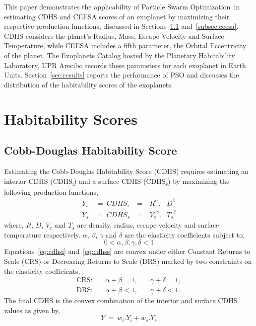 \documentclass[10pt]{article}
\newcommand{\pso}{Particle Swarm Optimization}
\begin{document}
This paper demonstrates the applicability of \pso\ in estimating CDHS and CEESA scores of an exoplanet by maximizing
their respective production functions, discussed in Sections~\ref{subsec:cdhs} and~\ref{subsec:ceesa}. CDHS considers
the planet's Radius, Mass, Escape Velocity and Surface Temperature, while CEESA includes a fifth parameter, the Orbital
Eccentricity of the planet. The Exoplanets Catalog hosted by the Planetary Habitability Laboratory, UPR Arecibo records
these parameters for each exoplanet in Earth Units. Section~\ref{sec:results} reports the performance of PSO and
discusses the distribution of the habitability scores of the exoplanets.


\section{Habitability Scores}\label{sec:habscore}

\subsection{Cobb-Douglas Habitability Score}\label{subsec:cdhs}
Estimating the Cobb-Douglas Habitability Score (CDHS) requires estimating an interior CDHS (CDHS\textsubscript{i}) and a
surface CDHS (CDHS\textsubscript{s}) by maximizing the following production functions,
\begin{subequations}
  \begin{alignat}{4}
    Y_i\ &=\ {CDHS}_i\ &=&\ R^\alpha.&D^\beta\label{eq:cdhsi}\\
    Y_s\ &=\ {CDHS}_s\ &=&\ {V_e}^\gamma.&{T_s}^\delta\label{eq:cdhss}
  \end{alignat}
\end{subequations}
where, $R$, $D$, $V_e$ and $T_s$ are density, radius, escape velocity and surface temperature respectively. $\alpha$,
$\beta$, $\gamma$ and $\delta$ are the elasticity coefficients subject to,
\begin{equation}
  0 < \alpha,\beta,\gamma,\delta < 1
\end{equation}
Equations~\ref{eq:cdhsi} and~\ref{eq:cdhss} are convex under either Constant Returns to Scale (CRS) or Decreasing
Returns to Scale (DRS) marked by two constraints on the elasticity coefficients,
\begin{subequations}
  \begin{alignat}{3}
    \text{CRS:} & \quad\alpha+\beta = 1,&\quad\gamma+\delta = 1,\\
    \text{DRS:} & \quad\alpha+\beta < 1,&\quad\gamma+\delta < 1.
  \end{alignat}
\end{subequations}
The final CDHS is the convex combination of the interior and surface CDHS values as given by,
\begin{equation}
  Y\ =\ w_i.Y_i + w_s.Y_s
\end{equation}
\end{document}
